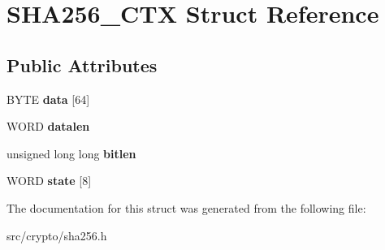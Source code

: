 \hypertarget{struct_s_h_a256___c_t_x}{}\section{S\+H\+A256\+\_\+\+C\+TX Struct Reference}
\label{struct_s_h_a256___c_t_x}
\subsection*{Public Attributes}
\begin{DoxyCompactItemize}
\item 
\mbox{\label{struct_s_h_a256___c_t_x_ac4cf981ce4100c3af150be3c98b2d03e}} 
B\+Y\+TE {\bfseries data} \mbox{[}64\mbox{]}
\item 
\mbox{\label{struct_s_h_a256___c_t_x_acff27dfecde1d6e42f7c8474a3175529}} 
W\+O\+RD {\bfseries datalen}
\item 
\mbox{\label{struct_s_h_a256___c_t_x_a7971befc0fa37b07350552d3a949634a}} 
unsigned long long {\bfseries bitlen}
\item 
\mbox{\label{struct_s_h_a256___c_t_x_a09c4eef8a0dc02bc9860e2a02c3f2638}} 
W\+O\+RD {\bfseries state} \mbox{[}8\mbox{]}
\end{DoxyCompactItemize}


The documentation for this struct was generated from the following file\+:\begin{DoxyCompactItemize}
\item 
src/crypto/sha256.\+h\end{DoxyCompactItemize}
